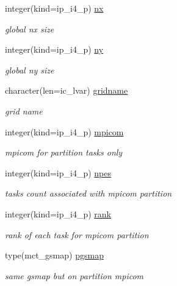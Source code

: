 \begin{DoxyCompactItemize}
integer(kind=ip\+\_\+i4\+\_\+p) \hyperlink{structmod__oasis__part_1_1prism__part__type_a7640ce8e1943f2fc70c8b072795502b2}{nx}
\begin{DoxyCompactList}\small\item\em global nx size \end{DoxyCompactList}\item 
integer(kind=ip\+\_\+i4\+\_\+p) \hyperlink{structmod__oasis__part_1_1prism__part__type_a4169783dee96aa9c60d43826daf6000c}{ny}
\begin{DoxyCompactList}\small\item\em global ny size \end{DoxyCompactList}\item 
character(len=ic\+\_\+lvar) \hyperlink{structmod__oasis__part_1_1prism__part__type_a4507d4efc53b93149a44bf44d12c9e56}{gridname}
\begin{DoxyCompactList}\small\item\em grid name \end{DoxyCompactList}\item 
integer(kind=ip\+\_\+i4\+\_\+p) \hyperlink{structmod__oasis__part_1_1prism__part__type_a5aaf8efdc7391d2a64f269dd97055612}{mpicom}
\begin{DoxyCompactList}\small\item\em mpicom for partition tasks only \end{DoxyCompactList}\item 
integer(kind=ip\+\_\+i4\+\_\+p) \hyperlink{structmod__oasis__part_1_1prism__part__type_a3f129d8d5ee4ccf7b071febc1c3f37c3}{npes}
\begin{DoxyCompactList}\small\item\em tasks count associated with mpicom partition \end{DoxyCompactList}\item 
integer(kind=ip\+\_\+i4\+\_\+p) \hyperlink{structmod__oasis__part_1_1prism__part__type_a1bf56b7dcc55c07cab5d1be13d33cfdd}{rank}
\begin{DoxyCompactList}\small\item\em rank of each task for mpicom partition \end{DoxyCompactList}\item 
type(mct\+\_\+gsmap) \hyperlink{structmod__oasis__part_1_1prism__part__type_ace66d3bf592452e56ffe202df3a09310}{pgsmap}
\begin{DoxyCompactList}\small\item\em same gsmap but on partition mpicom \end{DoxyCompactList}\item 

\end{DoxyCompactItemize}
